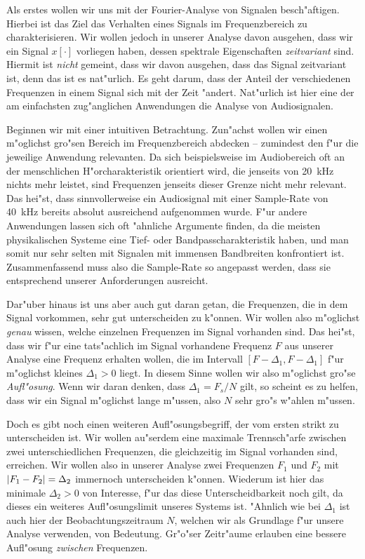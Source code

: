 Als erstes wollen wir uns mit der Fourier-Analyse von Signalen besch"aftigen.
Hierbei ist das Ziel das Verhalten eines Signals im Frequenzbereich zu charakterisieren.
Wir wollen jedoch in unserer Analyse davon ausgehen, dass wir ein Signal $x[\cdot]$ vorliegen haben, dessen spektrale Eigenschaften \emph{zeitvariant} sind.
Hiermit ist \emph{nicht} gemeint, dass wir davon ausgehen, dass das Signal zeitvariant ist, denn das ist es nat"urlich.
Es geht darum, dass der Anteil der verschiedenen Frequenzen in einem Signal sich mit der Zeit "andert.
Nat"urlich ist hier eine der am einfachsten zug"anglichen Anwendungen die Analyse von Audiosignalen.

Beginnen wir mit einer intuitiven Betrachtung.
Zun"achst wollen wir einen m"oglichst gro"sen Bereich im Frequenzbereich abdecken -- zumindest den f"ur die jeweilige Anwendung relevanten.
Da sich beispielsweise im Audiobereich oft an der menschlichen H"orcharakteristik orientiert wird, die jenseits von \SI{20}{\kilo\hertz} nichts mehr leistet, sind Frequenzen jenseits dieser Grenze nicht mehr relevant.
Das hei"st, dass sinnvollerweise ein Audiosignal mit einer Sample-Rate von \SI{40}{\kilo\hertz} bereits absolut ausreichend aufgenommen wurde.
F"ur andere Anwendungen lassen sich oft "ahnliche Argumente finden, da die meisten physikalischen Systeme eine Tief- oder Bandpasscharakteristik  haben, und man somit nur sehr selten mit Signalen mit immensen Bandbreiten konfrontiert ist.
Zusammenfassend muss also die Sample-Rate so angepasst werden, dass sie entsprechend unserer Anforderungen ausreicht.

Dar"uber hinaus ist uns aber auch gut daran getan, die Frequenzen, die in dem Signal vorkommen, sehr gut unterscheiden zu k"onnen.
Wir wollen also m"oglichst \emph{genau} wissen, welche einzelnen Frequenzen im Signal vorhanden sind. 
Das hei"st, dass wir f"ur eine tats"achlich im Signal vorhandene Frequenz $F$ aus unserer Analyse eine Frequenz erhalten wollen, die im Intervall $[F-\Delta_1,F-\Delta_1]$ f"ur m"oglichst kleines $\Delta_1 > 0$ liegt.
In diesem Sinne wollen wir also m"oglichst gro"se \emph{Aufl"osung}.
Wenn wir daran denken, dass $\Delta_1 = F_s/N$ gilt, so scheint es zu helfen, dass wir ein Signal m"oglichst lange  m"ussen, also $N$ sehr gro"s w"ahlen m"ussen.

Doch es gibt noch einen weiteren Aufl"osungsbegriff, der vom ersten strikt zu unterscheiden ist.
Wir wollen au"serdem eine maximale Trennsch"arfe zwischen zwei unterschiedlichen Frequenzen, die gleichzeitig im Signal vorhanden sind, erreichen.
Wir wollen also in unserer Analyse zwei Frequenzen $F_1$ und $F_2$ mit ${\left| F_1 - F_2 \right|} = \Delta_2$ immernoch unterscheiden k"onnen.
Wiederum ist hier das minimale $\Delta_2 > 0$ von Interesse, f"ur das diese Unterscheidbarkeit noch gilt, da dieses ein weiteres Aufl"osungslimit unseres Systems ist.
"Ahnlich wie bei $\Delta_1$ ist auch hier der Beobachtungszeitraum $N$, welchen wir als Grundlage f"ur unsere Analyse verwenden, von Bedeutung. 
Gr"o"ser Zeitr"aume erlauben eine bessere Aufl"osung \emph{zwischen} Frequenzen.

